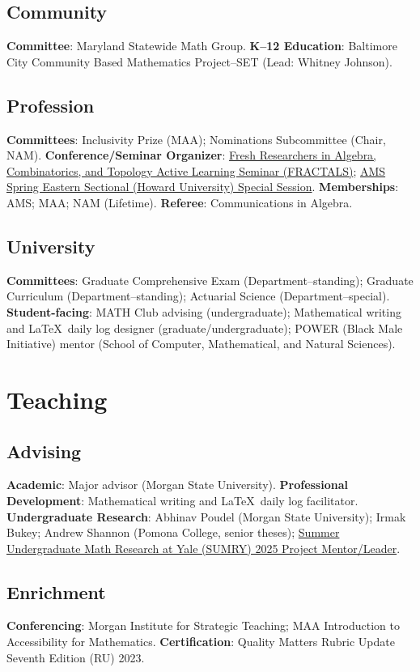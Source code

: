 \documentclass[10pt,a4paper]{article}
\newcommand{\Profile}{mathdwight} %
\newcommand{\MSU}{Morgan State University}
\newcommand{\Pomona}{Pomona College}
\newcommand{\SCMNS}{School of Computer, Mathematical, and Natural Sciences}
\begin{document}
\subsection{Community}
\textbf{Committee}: Maryland Statewide Math Group. \textbf{K--12 Education}: Baltimore City Community Based Mathematics Project--SET (Lead: Whitney Johnson). 
\subsection{Profession}
\textbf{Committees}: Inclusivity Prize (MAA); Nominations Subcommittee (Chair, NAM). \textbf{Conference/Seminar Organizer}: \href{https://\Profile.com/FRACTALS}{Fresh Researchers in Algebra, Combinatorics, and Topology Active Learning Seminar (FRACTALS)};  \href{https://www.ams.org/meetings/sectional/2312\_program\_ss15.html\#title}{AMS Spring Eastern Sectional (Howard University) Special Session}.  \textbf{Memberships}: AMS; MAA; NAM (Lifetime). \textbf{Referee}: Communications in Algebra. 
\subsection{University}
\textbf{Committees}: Graduate Comprehensive Exam (Department--standing); Graduate Curriculum (Department--standing); Actuarial Science (Department--special). \textbf{Student-facing}: MATH Club advising (undergraduate); Mathematical writing and \LaTeX\ daily log designer (graduate/undergraduate); POWER (Black Male Initiative) mentor (\SCMNS).
\section{Teaching}
\subsection{Advising}
\textbf{Academic}: Major advisor (\MSU). \textbf{Professional Development}: Mathematical writing and \LaTeX\ daily log facilitator. \textbf{Undergraduate Research}: Abhinav Poudel (\MSU); Irmak Bukey; Andrew Shannon (\Pomona, senior theses); \href{https://sumry.yale.edu/sumry-2025}{Summer Undergraduate Math Research at Yale (SUMRY) 2025 Project Mentor/Leader}. 
\subsection{Enrichment}
\textbf{Conferencing}: Morgan Institute for Strategic Teaching; MAA Introduction to Accessibility for Mathematics. \textbf{Certification}: Quality Matters Rubric Update Seventh Edition (RU) 2023.
\end{document}

